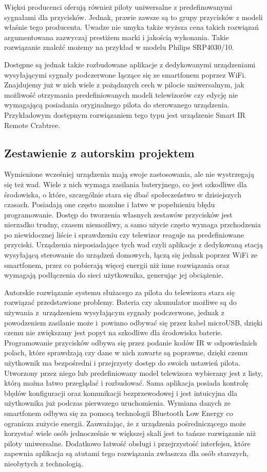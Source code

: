 \documentclass[12pt,twoside]{article}
\begin{document}
Więksi producenci oferują również piloty uniwersalne z predefinowanymi sygnałami dla przycisków. Jednak,
prawie zawsze są to grupy przycisków z modeli właśnie tego producenta. Uwadze nie umyka także wyższa cena takich
rozwiązań argumentowana zazwyczaj prestiżem marki i jakością wykonania. Takie rozwiązanie znaleźć
możemy na przykład w modelu Philips SRP4030/10\cite{expensiveController}.

Dostępne są jednak także rozbudowane aplikacje z dedykowanymi urządzeniami wysyłającymi sygnały podczerwone łączące się ze smartfonem poprzez WiFi. Znajdujemy już w nich wiele z pożądanych cech w pilocie uniwersalnym, jak możliwość otrzymania predefiniowanych modeli telewizorów czy edycję nie wymagającą posiadania oryginalnego pilota do sterowanego urządzenia. Przykładowym dostępnym rozwiązaniem tego typu jest urządzenie Smart IR Remote Crabtree\cite{appController}.
\subsection{Zestawienie z autorskim projektem}
{Wymienione wcześniej urządzenia mają swoje zastosowania, ale nie wystrzegają się też wad. Wiele z nich wymaga zasilania bateryjnego, co jest szkodliwe dla środowiska, o które, szczególnie stara się dbać społeczeństwo w dzisiejszych czasach. Posiadają one często mozolne i łatwe w popełnieniu błędu programowanie. Dostęp do tworzenia własnych zestawów przycisków jest nierzadko trudny, czasem niemożliwy, a samo użycie często wymaga przchodzenia po niewidocznej liście i sprawdzeniu czy telewizor reaguje na predefiniowane przyciski. Urządzenia nieposiadające tych wad czyli aplikacje z dedykowaną stacją wysyłającą sterowanie do urządzeń domowych, łączą się jednak poprzez WiFi ze smartfonem, przez co pobierają więcej energii niż inne rozwiązania oraz wymagają podłączenia do sieci użytkownika, generując jej obciążenie.

Autorskie rozwiązanie systemu służacego za pilota do telewizora stara się rozwiązać przedstawione problemy. Bateria czy akumulator możliwe są do używania z~urządzeniem wysyłającym sygnały podczerwone, jednak z powodzeniem zasilanie może i~powinno odbywać się przez kabel microUSB, dzięki czemu nie zwiększany jest popyt na szkodliwe dla środowiska baterie. Programowanie przycisków odbywa się przez podanie kodów IR w odpowiednich polach, które sprawdzają czy dane w nich zawarte są poprawne, dzięki czemu użytkownik ma bezpośredni i przejrzysty dostęp do swoich ustawień pilota. Utworzony przez niego lub predefiniowany model telewizora wybierany jest z listy, którą można łatwo przeglądać i rozbudować. Sama aplikacja posiada kontrolę błędów konfiguracji oraz komunikacji bezprzewodowej i jest intuicyjna dla użytkownika już podczas pierwszego uruchomienia. Wymiana danych ze smartfonem odbywa się za pomocą technologii Bluetooth Low Energy co ogranicza zużycie energii. Zauważając, że z urządzenia pośredniczącego może korzystać wiele osób jednocześnie w większej skali jest to tańsze rozwiązanie niż piloty uniwersalne. Dodatkowo łatwość obsługi i przejrzystość interfejsu, które zapewnia aplikacja są atutami tego rozwiązania zwłaszcza dla osób starszych, nieobytych z technologią.
}
\clearpage
\end{document}
